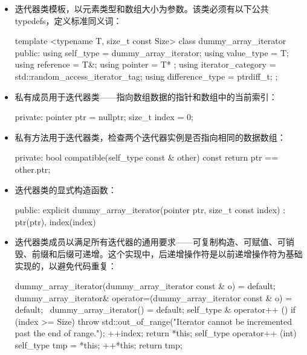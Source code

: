 \begin{itemize}
\item
迭代器类模板，以元素类型和数组大小为参数。该类必须有以下公共 typedefs，定义标准同义词：

\begin{cpp}
template <typename T, size_t const Size>
class dummy_array_iterator
{
public:
    using self_type         = dummy_array_iterator;
    using value_type        = T;
    using reference         = T&;
    using pointer           = T* ;
    using iterator_category = std::random_access_iterator_tag;
    using difference_type   = ptrdiff_t;
};
\end{cpp}

\item
私有成员用于迭代器类——指向数组数据的指针和数组中的当前索引：

\begin{cpp}
private:
    pointer ptr = nullptr;
    size_t index = 0;
\end{cpp}

\item
私有方法用于迭代器类，检查两个迭代器实例是否指向相同的数据数组：

\begin{cpp}
private:
    bool compatible(self_type const & other) const
    {
        return ptr == other.ptr;
    }
\end{cpp}

\item
迭代器类的显式构造函数：

\begin{cpp}
public:
    explicit dummy_array_iterator(pointer ptr,
        size_t const index)
    : ptr(ptr), index(index) { }
\end{cpp}

\item
迭代器类成员以满足所有迭代器的通用要求——可复制构造、可赋值、可销毁、前缀和后缀可递增。这个实现中，后递增操作符是以前递增操作符为基础实现的，以避免代码重复：

\begin{cpp}
dummy_array_iterator(dummy_array_iterator const & o)
    = default;
dummy_array_iterator& operator=(dummy_array_iterator const & o)
    = default;
~dummy_array_iterator() = default;
self_type & operator++ ()
{
    if (index >= Size)
        throw std::out_of_range("Iterator cannot be incremented
                                 past the end of range.");
    ++index;
    return *this;
}
self_type operator++ (int)
{
    self_type tmp = *this;
    ++*this;
    return tmp;
}
\end{cpp}


\end{itemize}
